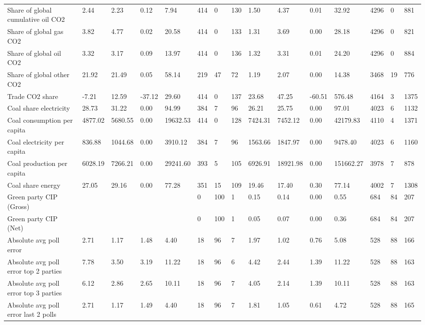 \begin{longtable}{lllllllllllllll}
Share of global cumulative oil CO2 & 2.44 & 2.23 & 0.12 & 7.94 & 414 & 0 & 130 & 1.50 & 4.37 & 0.01 & 32.92 & 4296 & 0 & 881\\
\addlinespace
Share of global gas CO2 & 3.82 & 4.77 & 0.02 & 20.58 & 414 & 0 & 133 & 1.31 & 3.69 & 0.00 & 28.18 & 4296 & 0 & 821\\
Share of global oil CO2 & 3.32 & 3.17 & 0.09 & 13.97 & 414 & 0 & 136 & 1.32 & 3.31 & 0.01 & 24.20 & 4296 & 0 & 884\\
Share of global other CO2 & 21.92 & 21.49 & 0.05 & 58.14 & 219 & 47 & 72 & 1.19 & 2.07 & 0.00 & 14.38 & 3468 & 19 & 776\\
Trade CO2 share & -7.21 & 12.59 & -37.12 & 29.60 & 414 & 0 & 137 & 23.68 & 47.25 & -60.51 & 576.48 & 4164 & 3 & 1375\\
Coal share electricity & 28.73 & 31.22 & 0.00 & 94.99 & 384 & 7 & 96 & 26.21 & 25.75 & 0.00 & 97.01 & 4023 & 6 & 1132\\
\addlinespace
Coal consumption per capita & 4877.02 & 5680.55 & 0.00 & 19632.53 & 414 & 0 & 128 & 7424.31 & 7452.12 & 0.00 & 42179.83 & 4110 & 4 & 1371\\
Coal electricity per capita & 836.88 & 1044.68 & 0.00 & 3910.12 & 384 & 7 & 96 & 1563.66 & 1847.97 & 0.00 & 9478.40 & 4023 & 6 & 1160\\
Coal production per capita & 6028.19 & 7266.21 & 0.00 & 29241.60 & 393 & 5 & 105 & 6926.91 & 18921.98 & 0.00 & 151662.27 & 3978 & 7 & 878\\
Coal share energy & 27.05 & 29.16 & 0.00 & 77.28 & 351 & 15 & 109 & 19.46 & 17.40 & 0.30 & 77.14 & 4002 & 7 & 1308\\
Green party CIP (Gross) &  &  &  &  & 0 & 100 & 1 & 0.15 & 0.14 & 0.00 & 0.55 & 684 & 84 & 207\\
\addlinespace
Green party CIP (Net) &  &  &  &  & 0 & 100 & 1 & 0.05 & 0.07 & 0.00 & 0.36 & 684 & 84 & 207\\
Absolute avg poll error & 2.71 & 1.17 & 1.48 & 4.40 & 18 & 96 & 7 & 1.97 & 1.02 & 0.76 & 5.08 & 528 & 88 & 166\\
Absolute avg poll error top 2 parties & 7.78 & 3.50 & 3.19 & 11.22 & 18 & 96 & 6 & 4.42 & 2.44 & 1.39 & 11.22 & 528 & 88 & 163\\
Absolute avg poll error top 3 parties & 6.12 & 2.86 & 2.65 & 10.11 & 18 & 96 & 7 & 4.05 & 2.14 & 1.39 & 10.11 & 528 & 88 & 163\\
Absolute avg poll error last 2 polls & 2.71 & 1.17 & 1.49 & 4.40 & 18 & 96 & 7 & 1.81 & 1.05 & 0.61 & 4.72 & 528 & 88 & 165\\

\end{longtable}

